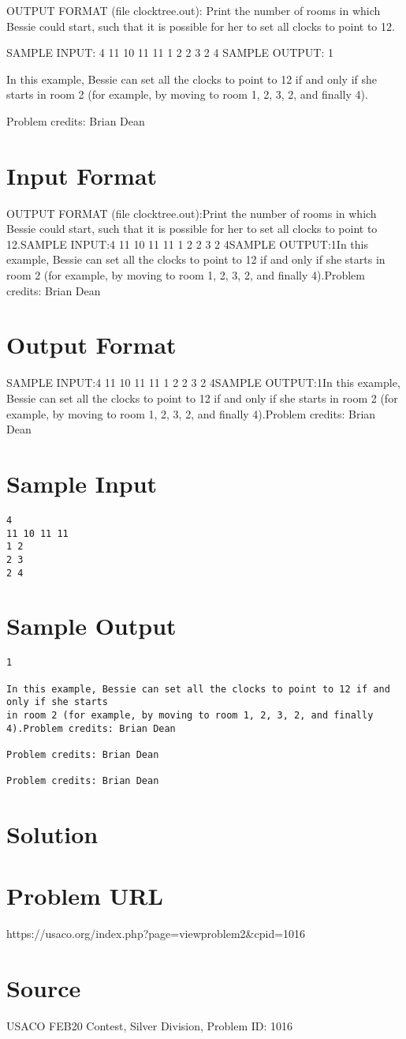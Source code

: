 \documentclass[12pt]{article}
\begin{document}
OUTPUT FORMAT (file clocktree.out):
Print the number of rooms in which Bessie could start, such that it is possible
for her to set all clocks to point to 12.

SAMPLE INPUT:
4
11 10 11 11
1 2
2 3
2 4
SAMPLE OUTPUT: 
1

In this example, Bessie can set all the clocks to point to 12 if and only if she starts
in room 2 (for example, by moving to room 1, 2, 3, 2, and finally 4).


Problem credits: Brian Dean



\section*{Input Format}
OUTPUT FORMAT (file clocktree.out):Print the number of rooms in which Bessie could start, such that it is possible
for her to set all clocks to point to 12.SAMPLE INPUT:4
11 10 11 11
1 2
2 3
2 4SAMPLE OUTPUT:1In this example, Bessie can set all the clocks to point to 12 if and only if she starts
in room 2 (for example, by moving to room 1, 2, 3, 2, and finally 4).Problem credits: Brian Dean

\section*{Output Format}
SAMPLE INPUT:4
11 10 11 11
1 2
2 3
2 4SAMPLE OUTPUT:1In this example, Bessie can set all the clocks to point to 12 if and only if she starts
in room 2 (for example, by moving to room 1, 2, 3, 2, and finally 4).Problem credits: Brian Dean

\section*{Sample Input}
\begin{verbatim}
4
11 10 11 11
1 2
2 3
2 4
\end{verbatim}

\section*{Sample Output}
\begin{verbatim}
1

In this example, Bessie can set all the clocks to point to 12 if and only if she starts
in room 2 (for example, by moving to room 1, 2, 3, 2, and finally 4).Problem credits: Brian Dean

Problem credits: Brian Dean

Problem credits: Brian Dean
\end{verbatim}

\section*{Solution}


\section*{Problem URL}
https://usaco.org/index.php?page=viewproblem2&cpid=1016

\section*{Source}
USACO FEB20 Contest, Silver Division, Problem ID: 1016
\end{document}

